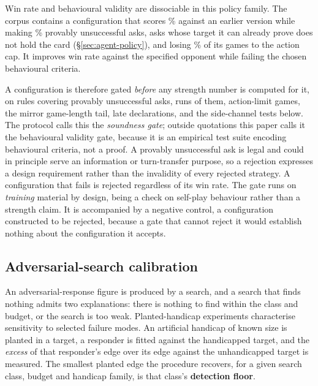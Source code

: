 Win rate and behavioural validity are dissociable in this policy family. The corpus contains a
configuration that scores \vsevenScoreboardTrapWin\% against an earlier version while making
\vsevenScoreboardTrapDead\% provably unsuccessful asks, asks whose target it can already prove does
not hold the card (\S\ref{sec:agent-policy}), and losing \vsevenScoreboardTrapLimit\% of its games
to the action cap. It improves win rate against the specified opponent while failing the chosen
behavioural criteria.

A configuration is therefore gated \emph{before} any strength number is computed for it, on
\vsevenGateRulesWord{} rules covering provably unsuccessful asks, runs of them, action-limit games,
the mirror game-length tail, late declarations, and the side-channel tests below. The protocol calls
this the \emph{soundness gate}; outside quotations this paper calls it the behavioural validity
gate, because it is an empirical test suite encoding behavioural criteria, not a proof. A provably unsuccessful ask is legal and
could in principle serve an information or turn-transfer purpose, so a rejection expresses a design
requirement rather than the invalidity of every rejected strategy. A configuration that fails is
rejected regardless of its win rate. The gate runs on \emph{training} material by design, being a
check on self-play behaviour rather than a strength claim. It is accompanied by a negative control,
a configuration constructed to be rejected, because a gate that cannot reject it would establish
nothing about the configuration it accepts.

\subsection{Adversarial-search calibration}
\label{sec:evaluation-floor}

An adversarial-response figure is produced by a search, and a search that finds nothing admits two
explanations: there is nothing to find within the class and budget, or the search is too weak.
Planted-handicap experiments characterise sensitivity to selected failure modes. An artificial
handicap of known size is planted in a target, a responder is fitted against the handicapped
target, and the \emph{excess} of that responder's edge over its edge against the unhandicapped
target is measured. The smallest planted edge the procedure recovers, for a given search class,
budget and handicap family, is that class's \textbf{detection floor}.

